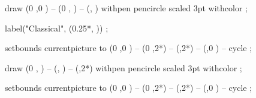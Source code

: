 \def\MMundi#1{%
\setbox\diSimpTmpBox=\hbox{#1}%
\diSimpTmpDimen\wd\diSimpTmpBox%
\setupMPvariables[MMundiNarrowTopBar]%
[textWidth=1.05\diSimpTmpDimen,textHeight=0.5\lineheight]%
\setupMPvariables[MMundiNarrowBottomBar]%
[textWidth=1.05\diSimpTmpDimen,textHeight=0.5\lineheight]%
\hbox to 1.05\diSimpTmpDimen {%
\rlap{\raise0.5ex\hbox{\useMPgraphic{MMundiNarrowTopBar}}}%
\rlap{\lower0.5ex\hbox{\useMPgraphic{MMundiNarrowBottomBar}}}%
\hfil\hbox{#1}\hfil}}

  draw
    (0                ,0                   ) --
    (0                ,  ) --
    (,  )
    withpen   pencircle scaled 3pt
    withcolor  ;
    
  label("Classical", (0.25*, )) ;
    
  setbounds currentpicture to
    (0                ,0                   ) --
    (0                ,2*) --
    (,2*) --
    (,0                   ) --
    cycle ;
\stopuseMPgraphic

  draw 
    (0                ,  ) -- 
    (,  ) -- 
    (,2*)
    withpen   pencircle scaled 3pt
    withcolor   ;
    
  setbounds currentpicture to
    (0                ,0                   ) --
    (0                ,2*) --
    (,2*) --
    (,0                   ) --
    cycle ;
\stopuseMPgraphic

\def\startMMundi{
  \setupMPvariables[MMundiTopBar]
    [textWidth=\textwidth,textHeight=0.5\lineheight]
  \useMPgraphic{MMundiTopBar}
}

\def\stopMMundi{
  \setupMPvariables[MMundiBottomBar]
    [textWidth=\textwidth,textHeight=0.5\lineheight]
  \endgraf\useMPgraphic{MMundiBottomBar}
}

\def\ToDo#1{\color[red]{\bf TODO: #1}}
\let\TODO\ToDo

\stopMkIVCode
